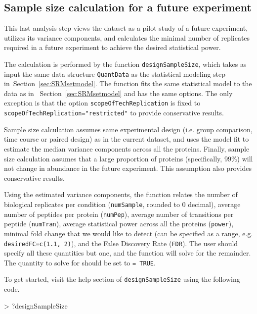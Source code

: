 \documentclass[11pt]{article}
\def\secref#1{Section~\ref{sec:#1}}
\begin{document}
\subsection{Sample size calculation for a future experiment \label{sec:SRMsamplesize}}

This last analysis step views the dataset as a pilot study of a future experiment, utilizes its variance components, and calculates the minimal number of replicates required in a future experiment to achieve the desired statistical power. 

The calculation is performed by the function {\tt designSampleSize}, which takes as input the same data structure {\tt QuantData} as the statistical modeling step in~\secref{SRMsetmodel}. The function fits the same statistical model to the data as in ~\secref{SRMsetmodel} and has the same options. The only exception is that the option {\tt scopeOfTechReplication} is fixed to {\tt scopeOfTechReplication="restricted"} to provide conservative results. 

Sample size calculation assumes same experimental design (i.e. group comparison, time course or paired design) as in the current dataset, and uses the model fit to estimate the median variance components across all the proteins. Finally, sample size calculation assumes that a large proportion of proteins (specifically,  99\%) will not change in abundance in the future experiment. This assumption also provides conservative results.

Using the estimated variance components, the function relates the number of biological replicates per condition ({\tt numSample}, rounded to 0 decimal), average number of peptides per protein ({\tt numPep}), average number of transitions per peptide ({\tt numTran}), average statistical power across all the proteins ({\tt power}), minimal fold change that we would like to detect (can be specified as a range, e.g. {\tt desiredFC=c(1.1, 2)}), and the False Discovery Rate ({\tt FDR}). The user should specify all these quantities but one, and the function will solve for the remainder. The quantity to solve for should be set to {\tt = TRUE}.

To get started, visit the help section of {\tt designSampleSize} using the following code.
\begin{small}
\begin{Schunk}
\begin{Sinput}
> ?designSampleSize
\end{Sinput}
\end{Schunk}
\end{small}
\end{document}
